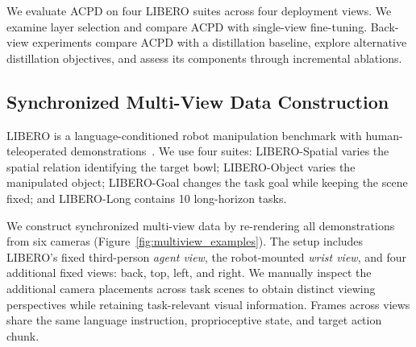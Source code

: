 \documentclass{ELSP}
\begin{document}
We evaluate ACPD on four LIBERO suites across four deployment views.
We examine layer selection and compare ACPD with single-view fine-tuning.
Back-view experiments compare ACPD with a distillation baseline,
explore alternative distillation objectives, and assess its components
through incremental ablations.




\subsection{Synchronized Multi-View Data Construction}

LIBERO is a language-conditioned robot manipulation benchmark with human-teleoperated demonstrations~\cite{NEURIPS2023_8c3c6668}. We use four suites: LIBERO-Spatial varies the spatial relation identifying the target bowl; LIBERO-Object varies the manipulated object; LIBERO-Goal changes the task goal while keeping the scene fixed; and LIBERO-Long contains 10 long-horizon tasks.

We construct synchronized multi-view data by re-rendering all
demonstrations from six cameras (Figure~\ref{fig:multiview_examples}).
The setup includes LIBERO's
fixed third-person \textit{agent view},
the robot-mounted \textit{wrist view}, and four additional fixed views:
back, top, left, and right. We manually inspect the additional camera
placements across task scenes to obtain distinct viewing perspectives
while retaining task-relevant visual information. Frames across views
share the same language instruction, proprioceptive state, and target
action chunk.
\end{document}
